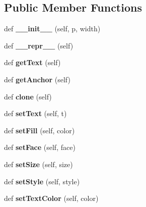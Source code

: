 \subsection*{Public Member Functions}
\begin{DoxyCompactItemize}
\item 
def {\bfseries \+\_\+\+\_\+init\+\_\+\+\_\+} (self, p, width)\hypertarget{classgraphics_1_1_entry_afb968169b4da90b66fd7cc34ffe8d93a}{}\label{classgraphics_1_1_entry_afb968169b4da90b66fd7cc34ffe8d93a}

\item 
def {\bfseries \+\_\+\+\_\+repr\+\_\+\+\_\+} (self)\hypertarget{classgraphics_1_1_entry_aea5b15bc4da7ede46e7cdd9991748c9e}{}\label{classgraphics_1_1_entry_aea5b15bc4da7ede46e7cdd9991748c9e}

\item 
def {\bfseries get\+Text} (self)\hypertarget{classgraphics_1_1_entry_a0a09f97f04f3d54bf8a5ca3edf99ef19}{}\label{classgraphics_1_1_entry_a0a09f97f04f3d54bf8a5ca3edf99ef19}

\item 
def {\bfseries get\+Anchor} (self)\hypertarget{classgraphics_1_1_entry_ab0a6e815195a49e1e682eb94d4735c9e}{}\label{classgraphics_1_1_entry_ab0a6e815195a49e1e682eb94d4735c9e}

\item 
def {\bfseries clone} (self)\hypertarget{classgraphics_1_1_entry_a15f95f96006286fead5e136792932434}{}\label{classgraphics_1_1_entry_a15f95f96006286fead5e136792932434}

\item 
def {\bfseries set\+Text} (self, t)\hypertarget{classgraphics_1_1_entry_a6a8f8c6cbc38f8efabe66785f09c735c}{}\label{classgraphics_1_1_entry_a6a8f8c6cbc38f8efabe66785f09c735c}

\item 
def {\bfseries set\+Fill} (self, color)\hypertarget{classgraphics_1_1_entry_ad1d04de2ffd36b0b6d6733fe992303ee}{}\label{classgraphics_1_1_entry_ad1d04de2ffd36b0b6d6733fe992303ee}

\item 
def {\bfseries set\+Face} (self, face)\hypertarget{classgraphics_1_1_entry_abaaf60215354bfbcecbd506e7176d54b}{}\label{classgraphics_1_1_entry_abaaf60215354bfbcecbd506e7176d54b}

\item 
def {\bfseries set\+Size} (self, size)\hypertarget{classgraphics_1_1_entry_a0e4a339c1fa89e228f750b7d5c6d8ced}{}\label{classgraphics_1_1_entry_a0e4a339c1fa89e228f750b7d5c6d8ced}

\item 
def {\bfseries set\+Style} (self, style)\hypertarget{classgraphics_1_1_entry_aa36a5f9e71331b921f0728c25631d9c3}{}\label{classgraphics_1_1_entry_aa36a5f9e71331b921f0728c25631d9c3}

\item 
def {\bfseries set\+Text\+Color} (self, color)\hypertarget{classgraphics_1_1_entry_a44e4c12f4ec190351fc8dc29bf7f0a37}{}\label{classgraphics_1_1_entry_a44e4c12f4ec190351fc8dc29bf7f0a37}

\end{DoxyCompactItemize}
